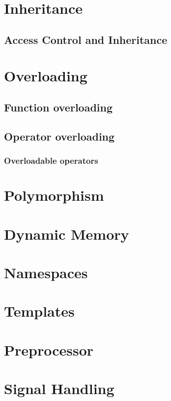 \documentclass[10pt,a4paper]{scrartcl}
\begin{document}
\begin{multicols*}{2}
\section{Inheritance}

\subsection{Access Control and Inheritance}

\section{Overloading}

\subsection{Function overloading}

\subsection{Operator overloading}

\subsubsection{Overloadable operators}

\section{Polymorphism}

\section{Dynamic Memory}

\section{Namespaces}

\section{Templates}

\section{Preprocessor}

\section{Signal Handling}


\end{multicols*}
\end{document}
